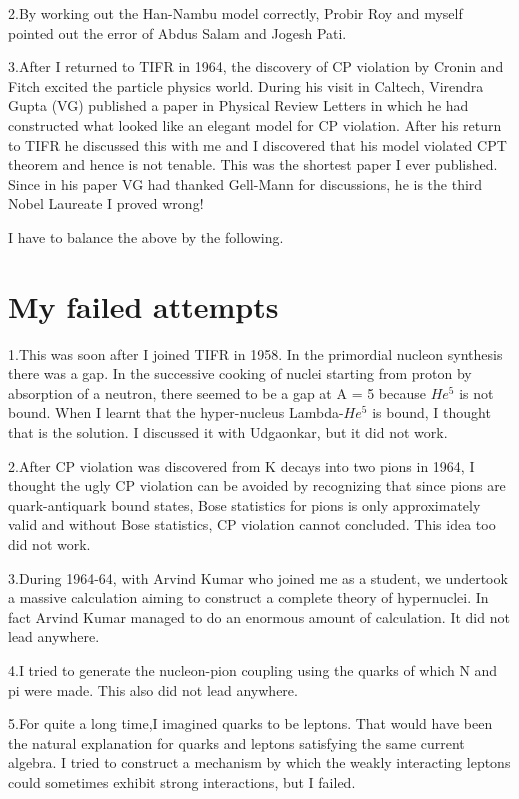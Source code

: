 2.By working out the Han-Nambu model correctly, Probir Roy and myself 
pointed out the error of Abdus Salam and Jogesh Pati.

3.After I returned to TIFR in 1964, the discovery of CP violation by 
Cronin and Fitch excited the particle physics world. During his visit in 
Caltech, Virendra Gupta (VG) published a paper in Physical Review 
Letters in which he had constructed what looked like an elegant model 
for CP violation. After his return to TIFR he discussed this with me and 
I discovered that his model violated CPT theorem and hence is not 
tenable. This was the shortest paper I ever published. Since in his 
paper VG had thanked Gell-Mann for discussions, he is the third Nobel 
Laureate I proved wrong!

I have to balance the above by the following.

\section*{My failed attempts}

1.This was soon after I joined TIFR in 1958. In the primordial nucleon 
synthesis there was a gap. In the successive cooking of nuclei starting 
from proton by absorption of a neutron, there seemed to be a gap at A = 
5 because $He^5$ is not bound. When I learnt that the hyper-nucleus 
Lambda-$He^5$ is bound, I thought that is the solution. I discussed it 
with Udgaonkar, but it did not work.

2.After CP violation was discovered from K decays into two pions in 
1964, I thought the ugly CP violation can be avoided by recognizing that 
since pions are quark-antiquark bound states, Bose statistics for pions 
is only approximately valid and without Bose statistics, CP violation 
cannot concluded. This idea too did not work.

3.During 1964-64, with Arvind Kumar who joined me as a student, we 
undertook a massive calculation aiming to construct a complete theory of 
hypernuclei. In fact Arvind Kumar managed to do an enormous amount of 
calculation. It did not lead anywhere.

4.I tried to generate the nucleon-pion coupling using the quarks of 
which N and pi were made. This also did not lead anywhere.

5.For quite a long time,I imagined quarks to be leptons. That would have 
been the natural explanation for quarks and leptons satisfying the same 
current algebra. I tried to construct a mechanism by which the weakly 
interacting leptons could sometimes exhibit strong interactions, but I 
failed.

